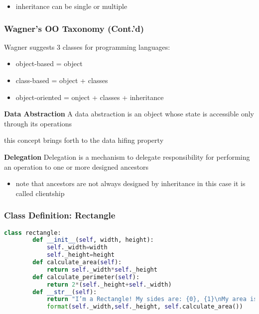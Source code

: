 \begin{itemize}
	\item  inheritance can be single or multiple
\end{itemize}

\subsubsection{Wagner’s OO Taxonomy (Cont.’d)}

Wagner suggests 3 classes for programming languages:

\begin{itemize}
	\item object-based = object
	\item class-based = object + classes
	\item object-oriented = onject + classes + inheritance
\end{itemize}

\textbf{Data Abstraction}
A data abstraction is an object whose state is accessible only through its operations

\begin{itemize}
	\iem this concept brings forth to the data hifing property
\end{itemize}

\textbf{Delegation}
Delegation is a mechanism to delegate responsibility for performing an operation to one or more designed ancestors

\begin{itemize}
		\item note that ancestors are not always designed by inheritance in this case it is called clientship
\end{itemize}

\subsubsection{Class Definition: Rectangle}

\begin{lstlisting}[language=Python]
	class rectangle:
		def __init__(self, width, height):
			self._width=width
			self._height=height
		def calculate_area(self):
			return self._width*self._height
		def calculate_perimeter(self):
			return 2*(self._height+self._width)
		def __str__(self):
			return "I’m a Rectangle! My sides are: {0}, {1}\nMy area is {2}".\
			format(self._width,self._height, self.calculate_area())
\end{lstlisting}

